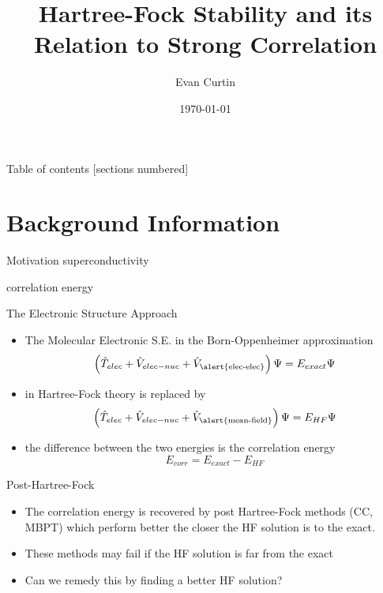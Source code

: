 \documentclass[10pt]{beamer}
\title{Hartree-Fock Stability and its Relation to Strong Correlation}
\date{\today}
\author{Evan Curtin}
\institute{University of Illinois at Urbana-Champaign}
\begin{document}
\maketitle

\begin{frame}{Table of contents}
  [sections numbered]
  \tableofcontents[hideallsubsections]
\end{frame}

\section{Background Information}

\begin{frame}{Motivation}
superconductivity

correlation energy

\end{frame}



\begin{frame}{The Electronic Structure Approach}
	\begin{itemize}[<+->]
		\item {The Molecular Electronic S.E. in the Born-Oppenheimer approximation
		  \begin{equation*}
  		  \left( 
        \hat{T}_{elec} + \hat{V}_{elec-nuc} 
                       + \hat{V}_{\textrm{\alert{elec-elec}}} 
  		 \right)
  		 \Psi
  		  = E_{exact}\Psi
		  \end{equation*}
		}
		\item {in Hartree-Fock theory is replaced by
		  \begin{equation*}
  		  \left( 
        \hat{T}_{elec} + \hat{V}_{elec-nuc} + 
  		   \hat{V}_{\textrm{\alert{mean-field}}} 
  		 \right)
  		 \Psi
  		  = E_{HF}\Psi
		  \end{equation*}
		}
		\item {the difference between the two energies is the \alert{correlation energy}
		  \begin{equation*}
		    E_{corr} = E_{exact} - E_{HF}
		  \end{equation*}
    }

	\end{itemize}
\end{frame}

\begin{frame}{Post-Hartree-Fock}
  \begin{itemize}
    \item {The correlation energy is recovered by post Hartree-Fock methods (CC, MBPT)
    which perform better the closer the HF solution is to the exact.} 
    \item {These methods may fail if the HF solution is far from the exact}
    \item {Can we remedy this by finding a better HF solution?}
  \end{itemize}
\end{frame}
\end{document}
